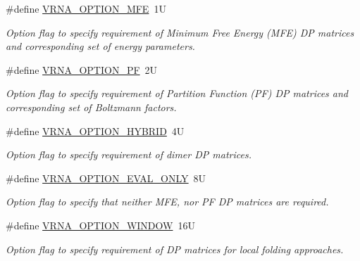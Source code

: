 \begin{DoxyCompactItemize}
\#define \hyperlink{group__fold__compound_gae63be9127fe7dcc1f9bb14f5bb1064ee}{V\+R\+N\+A\+\_\+\+O\+P\+T\+I\+O\+N\+\_\+\+M\+FE}~1U
\begin{DoxyCompactList}\small\item\em Option flag to specify requirement of Minimum Free Energy (M\+FE) DP matrices and corresponding set of energy parameters. \end{DoxyCompactList}\item 
\#define \hyperlink{group__fold__compound_gabfbadcddda3e74ce7f49035ef8f058f7}{V\+R\+N\+A\+\_\+\+O\+P\+T\+I\+O\+N\+\_\+\+PF}~2U
\begin{DoxyCompactList}\small\item\em Option flag to specify requirement of Partition Function (PF) DP matrices and corresponding set of Boltzmann factors. \end{DoxyCompactList}\item 
\mbox{\label{group__fold__compound_ga8f681fa12b8d4b348bf58415fd1fc82f}} 
\#define \hyperlink{group__fold__compound_ga8f681fa12b8d4b348bf58415fd1fc82f}{V\+R\+N\+A\+\_\+\+O\+P\+T\+I\+O\+N\+\_\+\+H\+Y\+B\+R\+ID}~4U
\begin{DoxyCompactList}\small\item\em Option flag to specify requirement of dimer DP matrices. \end{DoxyCompactList}\item 
\#define \hyperlink{group__fold__compound_ga61469c423131552c8483229f8b6c7e0e}{V\+R\+N\+A\+\_\+\+O\+P\+T\+I\+O\+N\+\_\+\+E\+V\+A\+L\+\_\+\+O\+N\+LY}~8U
\begin{DoxyCompactList}\small\item\em Option flag to specify that neither M\+FE, nor PF DP matrices are required. \end{DoxyCompactList}\item 
\mbox{\label{group__fold__compound_ga2b2a8009ccdccc3eb1571556261aee8e}} 
\#define \hyperlink{group__fold__compound_ga2b2a8009ccdccc3eb1571556261aee8e}{V\+R\+N\+A\+\_\+\+O\+P\+T\+I\+O\+N\+\_\+\+W\+I\+N\+D\+OW}~16U
\begin{DoxyCompactList}\small\item\em Option flag to specify requirement of DP matrices for local folding approaches. \end{DoxyCompactList}\end{DoxyCompactItemize}
